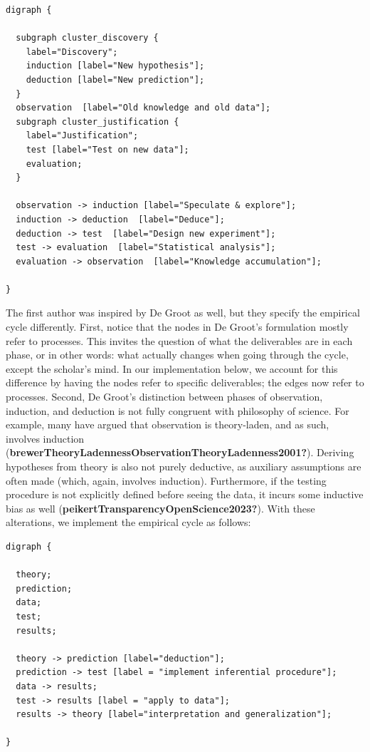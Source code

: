 \documentclass[
  man,floatsintext]{apa6}
\begin{document}
\begin{verbatim}
digraph {

  subgraph cluster_discovery {
    label="Discovery";
    induction [label="New hypothesis"];
    deduction [label="New prediction"];
  }
  observation  [label="Old knowledge and old data"];
  subgraph cluster_justification {
    label="Justification";
    test [label="Test on new data"];
    evaluation;
  }

  observation -> induction [label="Speculate & explore"];
  induction -> deduction  [label="Deduce"];
  deduction -> test  [label="Design new experiment"];
  test -> evaluation  [label="Statistical analysis"];
  evaluation -> observation  [label="Knowledge accumulation"];

}
\end{verbatim}

The first author was inspired by De Groot as well,
but they specify the empirical cycle differently.
First, notice that the nodes in De Groot's formulation mostly refer to processes.
This invites the question of what the deliverables are in each phase, or in other words: what actually changes when going through the cycle, except the scholar's mind.
In our implementation below, we account for this difference by having the nodes refer to specific deliverables; the edges now refer to processes.
Second, De Groot's distinction between phases of observation, induction, and deduction is not fully congruent with philosophy of science.
For example, many have argued that observation is theory-laden, and as such, involves induction (\textbf{brewerTheoryLadennessObservationTheoryLadenness2001?}).
Deriving hypotheses from theory is also not purely deductive,
as auxiliary assumptions are often made (which, again, involves induction).
Furthermore, if the testing procedure is not explicitly defined before seeing the data, it incurs some inductive bias as well (\textbf{peikertTransparencyOpenScience2023?}).
With these alterations, we implement the empirical cycle as follows:

\begin{verbatim}
digraph {

  theory;
  prediction;
  data;
  test;
  results;
  
  theory -> prediction [label="deduction"];
  prediction -> test [label = "implement inferential procedure"];
  data -> results;
  test -> results [label = "apply to data"];
  results -> theory [label="interpretation and generalization"];

}
\end{verbatim}
\end{document}
